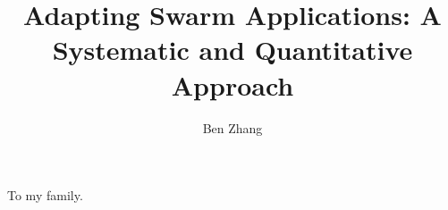 \documentclass[phd]{ucbthesis}
\begin{document}
\title{Adapting Swarm Applications: A Systematic and Quantitative Approach}
\author{Ben Zhang}

\maketitle

{ \dsp\copyrightpage }



\begin{frontmatter}
  \begin{dedication}
    \null\vfil
    \begin{center}
      \vspace*{\fill}
      To my family.
      \vspace*{\fill}
    \end{center}
    \vfil\null
  \end{dedication}

  \tableofcontents
  \clearpage
  \listoffigures
  \clearpage
  \listoftables

  
\end{frontmatter}

\pagestyle{headings}








\begin{appendices}
  
\end{appendices}

\printbibliography
\end{document}
